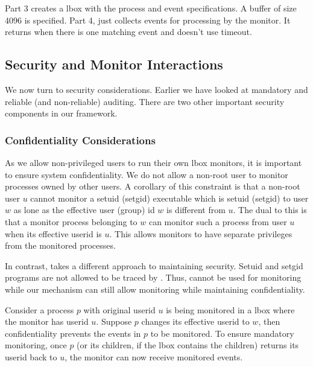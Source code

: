 Part 3 creates a lbox with the process and event specifications.
A buffer of size 4096 is specified.
Part 4, just collects events for processing by the monitor.
It returns when there is one matching event and doesn't use timeout.



\subsection{Security and Monitor Interactions}

We now turn to security considerations. Earlier we have looked
at mandatory and reliable (and non-reliable) auditing.
There are two other important security components in our framework.

\subsubsection{Confidentiality Considerations}
As we allow non-privileged users to run their own lbox monitors,
it is important to ensure system confidentiality. 
We do not allow a non-root user to monitor processes owned by other users.
A corollary of this constraint is that
a non-root user $u$ cannot monitor a setuid (setgid) executable
which is setuid (setgid) to user $w$ as lone as the effective user (group) id
$w$ is different from $u$.
The dual to this is that a monitor process belonging to $w$ can monitor
such a process from user $u$ when its effective userid is $u$.
This allows monitors to have separate privileges from the monitored
processes.

In contrast,  takes a different approach to maintaining
security.
Setuid and setgid programs are not allowed to be traced by .
Thus,  cannot be used for monitoring while our mechanism can
still allow monitoring while maintaining confidentiality.

Consider a process $p$ with original userid $u$ is being monitored in a lbox
where the monitor has userid $u$.
Suppose $p$ changes its effective userid to $w$, then confidentiality
prevents the events in $p$ to be monitored.
To ensure mandatory monitoring, once $p$ (or its children, if the
lbox contains the children) returns its userid back to $u$, the monitor
can now receive monitored events.

